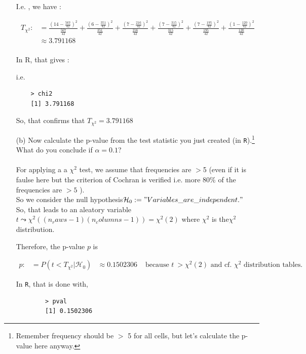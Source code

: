 \documentclass[12pt,letterpaper]{article}
\begin{document}
\begin{enumerate}
	I.e. , we have : 	

	\begin{align*}
		T_{\chi^2}: &= \frac{(14 - \frac{567}{42})^2}{\frac{567}{42}} + \frac{(6 -\frac{351}{42})^2}{\frac{351}{42}} + \frac{(7 - \frac{216}{42})^2}{\frac{216}{42}} +  \frac{(7 - \frac{315}{42})^2}{\frac{315}{42}}  + \frac{(7 - \frac{195}{42})^2}{\frac{195}{42}}  +  \frac{(1 - \frac{120}{42})^2}{\frac{120}{42}} \\
		&\approx 3.791168\\
	\end{align*}

	In R, that gives :
	  
	i.e. 
	\begin{verbatim}
	> chi2
	[1] 3.791168
	\end{verbatim}
	 So, that confirms that $T_{\chi^2}=3.791168$


	\item [(b)]
	Now calculate the p-value from the test statistic you just created (in \texttt{R}).\footnote{Remember frequency should be $>$ 5 for all cells, but let's calculate the p-value here anyway.}  What do you conclude if $\alpha = 0.1$?\\
	\\
	For applying a a $\chi^2$ test, we assume that frequencies are $>$5 (even if it is faulse here but the criterion of Cochran is verified i.e. more 80\% of the frequencies are $>5$ ). \\
	
	So we consider the null hypothesis$ \mathcal{H}_0:={"Variables\_ are\_independent."}$	\\

	So, that leads to an aleatory variable $t \leadsto \chi^2((n_raws-1)(n_columns-1)) = \chi^2(2)$ where $\chi^2$ is the$ \chi^2$ distribution. 
	
	Therefore,  the p-value $p$ is

	\begin{align*}
		p:&=P(t<T_{\chi^2}|\mathcal{H}_0) 
		&\approx 0.1502306 &\mbox{ because $t~>\chi^2(2)$ and cf. $\chi^2$ distribution tables. }
	\end{align*}	
	
	In \texttt{R}, that is done with,
	  
	
	\begin{verbatim}
		> pval
		[1] 0.1502306
	\end{verbatim}


\end{enumerate}
\end{document}
